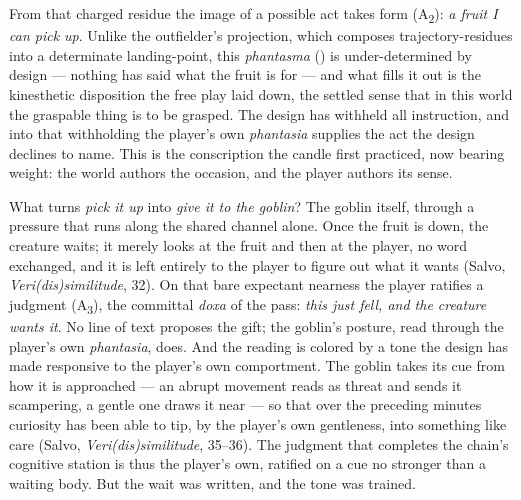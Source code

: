 From that charged residue the image of a possible act takes form (A\textsubscript{2}): \textit{a fruit I can pick up}. Unlike the outfielder's projection, which composes trajectory-residues into a determinate landing-point, this \textit{phantasma} () is under-determined by design — nothing has said what the fruit is for — and what fills it out is the kinesthetic disposition the free play laid down, the settled sense that in this world the graspable thing is to be grasped. The design has withheld all instruction, and into that withholding the player's own \textit{phantasia} supplies the act the design declines to name. This is the conscription the candle first practiced, now bearing weight: the world authors the occasion, and the player authors its sense.

What turns \textit{pick it up} into \textit{give it to the goblin}? The goblin itself, through a pressure that runs along the shared channel alone. Once the fruit is down, the creature waits; it merely looks at the fruit and then at the player, no word exchanged, and it is left entirely to the player to figure out what it wants (Salvo, \textit{Veri(dis)similitude}, 32). On that bare expectant nearness the player ratifies a judgment (A\textsubscript{3}), the committal \textit{doxa} of the pass: \textit{this just fell, and the creature wants it}. No line of text proposes the gift; the goblin's posture, read through the player's own \textit{phantasia}, does. And the reading is colored by a tone the design has made responsive to the player's own comportment. The goblin takes its cue from how it is approached — an abrupt movement reads as threat and sends it scampering, a gentle one draws it near — so that over the preceding minutes curiosity has been able to tip, by the player's own gentleness, into something like care (Salvo, \textit{Veri(dis)similitude}, 35--36). The judgment that completes the chain's cognitive station is thus the player's own, ratified on a cue no stronger than a waiting body. But the wait was written, and the tone was trained.

